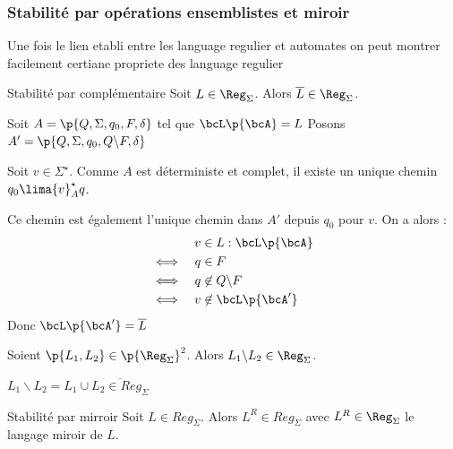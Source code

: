     \subsubsection{Stabilité par opérations ensemblistes et miroir}
    
        Une fois le lien etabli entre les language regulier et automates on peut montrer facilement certiane propriete des language regulier 
        
    \begin{theorem}{Stabilité par complémentaire}{}
        Soit $L \in \Reg_\Sigma$. Alors $\overline{L} \in \Reg_\Sigma$.
    \end{theorem}
    
    \begin{nproof}
        Soit $A = \p{Q, \Sigma, q_0, F, \delta}$ tel que $\bcL\p{\bcA} = L$
        Posons $A' =  \p{Q, \Sigma, q_0, Q \backslash F, \delta}$
        
        Soit $v \in \Sigma^\star$. Comme $A$ est déterministe et complet, il existe un unique chemin $q_0 \lima{v}_A^\star q$.
    
        Ce chemin est également l'unique chemin dans $A'$ depuis $q_0$ pour $v$. On a alors :
        \begin{align*}
                && v &\in L : \bcL\p{\bcA}\\
            \iff && q &\in F\\
            \iff && q &\not\in Q \backslash F\\
            \iff && v &\not\in \bcL\p{\bcA'}
        \end{align*}
        Donc $\bcL\p{\bcA'} = \overline{L}$
    
    \end{nproof}
    
    \begin{corollary}{}{}
        Soient $\p{L_1, L_2} \in \p{\Reg_\Sigma}^2$. Alors $L_1 \backslash L_2 \in \Reg_\Sigma$.
    \end{corollary}
        
    \begin{nproof}
        $L_1 \backslash L_2 = L_1 \cup \overline{L_2 \in Reg_\Sigma}$
    \end{nproof}
    
    \begin{theorem}{Stabilité par mirroir}{}
        Soit $L \in Reg_\Sigma$.
        Alors $L^R \in Reg_\Sigma$ avec $L^R \in \Reg_\Sigma$ le langage miroir de $L$.
    \end{theorem}
    
